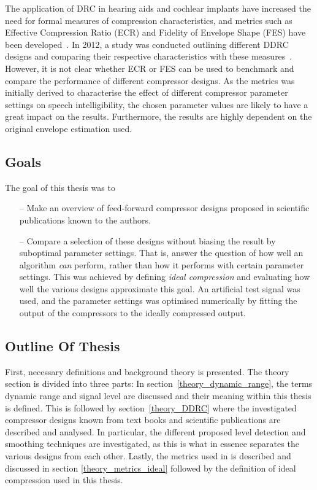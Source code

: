 \documentclass[../main2.tex]{subfiles}
\begin{document}
The application of DRC in hearing aids and cochlear implants have increased the need for formal measures of compression characteristics, and metrics such as Effective Compression Ratio (ECR) and Fidelity of Envelope Shape (FES) have been developed~\cite{stone1992syllabic, stone2007quantifying}. In 2012, a study was conducted outlining different DDRC designs and comparing their respective characteristics with these measures~\cite{reiss2012tutorial}. However, it is not clear whether ECR or FES can be used to benchmark and compare the performance of different compressor designs. As the metrics was initially derived to characterise the effect of different compressor parameter settings on speech intelligibility, the chosen parameter values are likely to have a great impact on the results. Furthermore, the results are highly dependent on the original envelope estimation used.

\subsection{Goals}
The goal of this thesis was to
\begin{itemize}
\item[--] Make an overview of feed-forward compressor designs proposed in scientific publications known to the authors.
\item[--] Compare a selection of these designs without biasing the result by suboptimal parameter settings. That is, answer the question of how well an algorithm \emph{can} perform, rather than how it performs with certain parameter settings. This was achieved by defining \emph{ideal compression} and evaluating how well the various designs approximate this goal. An artificial test signal was used, and the parameter settings was optimised numerically by fitting the output of the compressors to the ideally compressed output.
\end{itemize}

\subsection{Outline Of Thesis}
First, necessary definitions and background theory is presented. The theory section is divided into three parts: In section~\ref{theory_dynamic_range}, the terms dynamic range and signal level are discussed and their meaning within this thesis is defined. This is followed by section~\ref{theory_DDRC} where the investigated compressor designs known from text books and scientific publications are described and analysed. In particular, the different proposed level detection and smoothing techniques are investigated, as this is what in essence separates the various designs from each other. Lastly, the metrics used in \cite{stone1992syllabic, stone2007quantifying, reiss2012tutorial} is described and discussed in section \ref{theory_metrics_ideal} followed by the definition of ideal compression used in this thesis.
\end{document}
